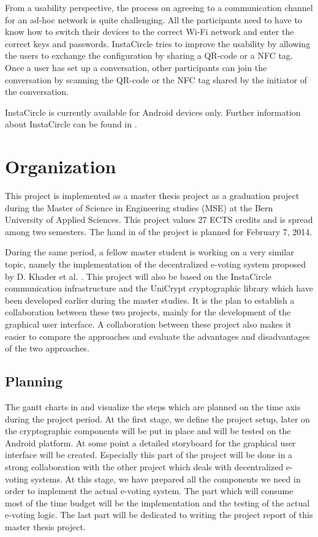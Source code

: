 \documentclass[numbers=noenddot, abstract=on, a4paper, headsepline,
footsepline, oneside, draft=off]{scrreprt}
\begin{document}
From a usability perspective, the process on agreeing to a communication channel
for an ad-hoc network is quite challenging. All the participants need to have
to know how to switch their devices to the correct Wi-Fi network and enter the
correct keys and passwords. InstaCircle tries to improve the usability by
allowing the users to exchange the configuration by sharing a QR-code or a NFC
tag. Once a user has set up a conversation, other participants can join the
conversation by scanning the QR-code or the NFC tag shared by the initiator of
the conversation.

InstaCircle is currently available for Android devices only. Further information
about InstaCircle can be found in \cite{ritter13a}.



\chapter{Organization}
\label{cha:organization}
This project is implemented as a master thesis project as a graduation project
during the Master of Science in Engineering studies (MSE) at the Bern University
of Applied Sciences. This project values 27 ECTS credits and is spread among two
semesters. The hand in of the project is planned for February 7, 2014.

During the same period, a fellow master student is working on a very similar
topic, namely the implementation of the decentralized e-voting system proposed by
D. Khader et al. \cite{HKRS12}. This project will also be based on the
InstaCircle communication infrastructure \cite{ritter13a} and the UniCrypt
cryptographic library \cite{ritter12} which have been developed earlier during
the master studies. It is the plan to establish a collaboration between these
two projects, mainly for the development of the graphical user interface. A
collaboration between these project also makes it easier to compare the
approaches and evaluate the advantages and disadvantages of the two approaches.

\section{Planning}
\label{sec:planning}
The gantt charts in  and 
visualize the steps which are planned on the time axis during the project period. At the first stage, we define the project setup,
later on the cryptographic components will be put in place and will be tested on
the Android platform. At some point a detailed storyboard for the graphical
user interface will be created. Especially this part of the project will be done
in a strong collaboration with the other project which deals with decentralized e-voting
systems. At this stage, we have prepared all the components we need in order to
implement the actual e-voting system. The part which will consume most of the
time budget will be the implementation and the testing of the actual e-voting
logic. The last part will be dedicated to writing the project report of this
master thesis project.
\end{document}
